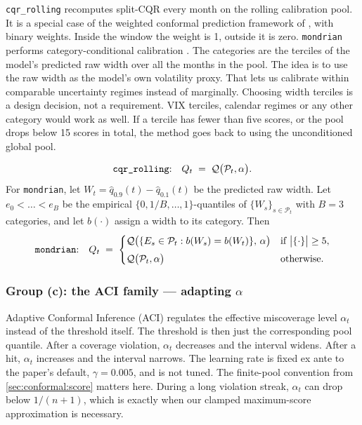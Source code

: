 \texttt{cqr\_rolling} recomputes split-CQR every month on the rolling
calibration pool. It is a special case of the weighted conformal prediction
framework of \textcite{barber2023nexcp}, with binary weights. Inside the window the weight is 1, outside it is zero. \texttt{mondrian} performs category-conditional
calibration \parencite{vovk2003mondrian}. The categories are the terciles of the model's predicted raw width over all the months in the pool. The idea is to use the raw width as the model's own volatility proxy. That lets us calibrate within comparable uncertainty regimes instead of marginally. Choosing width terciles is a design decision, not a requirement. VIX terciles, calendar regimes or any other category would work as well. If a tercile has fewer than five scores, or the pool drops below 15 scores in total, the method goes back to using the unconditioned global pool.

\begin{equation}
  \text{\texttt{cqr\_rolling}:}\quad
  Q_t \;=\; \mathcal{Q}\big(\mathcal{P}_t, \alpha\big).
  \label{eq:m-rolling}
\end{equation}
For \texttt{mondrian}, let $W_t = \hat q_{0.9}(t) - \hat q_{0.1}(t)$ be the
predicted raw width. Let $e_0 < \dots < e_{B}$ be the empirical
$\{0, 1/B, \dots, 1\}$-quantiles of $\{W_s\}_{s \in \mathcal{P}_t}$ with
$B = 3$ categories, and let $b(\cdot)$ assign a width to its category. Then
\begin{equation}
  \text{\texttt{mondrian}:}\quad
  Q_t \;=\;
  \begin{cases}
    \mathcal{Q}\big(\{E_s \in \mathcal{P}_t : b(W_s) = b(W_t)\},\, \alpha\big)
      & \text{if } \big|\{\cdot\}\big| \ge 5, \\[4pt]
    \mathcal{Q}\big(\mathcal{P}_t, \alpha\big) & \text{otherwise.}
  \end{cases}
  \label{eq:m-mondrian}
\end{equation}

\subsubsection{Group (c): the ACI family --- adapting $\alpha$}
\label{sec:conformal:aci}

Adaptive Conformal Inference (ACI) \parencite{gibbs2021aci} regulates the
effective miscoverage level $\alpha_t$ instead of the threshold itself. The
threshold is then just the corresponding pool quantile. After a coverage
violation, $\alpha_t$ decreases and the interval widens. After a hit, $\alpha_t$
increases and the interval narrows. The learning rate is fixed ex ante to the
paper's default, $\gamma = 0.005$, and is not tuned. The finite-pool convention
from \cref{sec:conformal:score} matters here. During a long violation streak,
$\alpha_t$ can drop below $1/(n+1)$, which is exactly when our clamped
maximum-score approximation is necessary.


